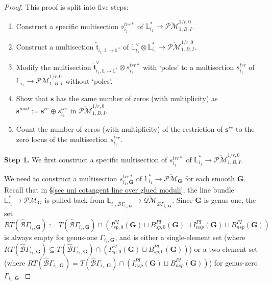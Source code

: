 \documentclass[11pt]{amsart}
\theoremstyle{definition}
\theoremstyle{remark}
\newcommand{\oPMb}{{\overline{\mathcal{PM}}}}
\newcommand{\oQMb}{{\overline{\mathcal{QM}}}}
\newcommand{\nontilde}{}
\newcommand{\<}{\left<}
\renewcommand{\>}{\right>}
\numberwithin{equation}{section}
\begin{document}
\begin{proof}
    
    This proof is split into five steps:
    \begin{enumerate}
        \item  Construct a specific multisection $\nontilde{s}^{trr*}_{i_1}$ of $\mathbb L^*_{i_1}\to \oPMb^{1/r,0}_{1,B,I}$.
        \item Construct a multisection $\tilde{\mathfrak{t}}_{i_1,\mathbb L \to \mathbb L^*}$ of $\mathbb L^\vee_{i_1}\otimes \mathbb L^*_{i_1}\to \oPMb^{1/r,0}_{1,B,I}$.
        \item  Modify the multisection $\tilde{\mathfrak{t}}^\vee_{i_1,\mathbb L \to \mathbb L^*}\otimes \nontilde{s}^{trr*}_{i_1}$ with `poles' to a multisection $\nontilde{s}^{trr}_{i_1}$ of $\mathbb L_{i_1}\to \oPMb^{1/r,0}_{1,B,I}$ without `poles'.
        \item Show that $\bm{s}$ has the same number of zeros (with multiplicity) as $\bm{s}^{mod}:=\bm{s}^{re} \oplus \nontilde{s}^{trr}_{i_1}$ in $\oPMb^{1/r,0}_{1,B,I}$.
        \item Count the number of zeros (with multiplicity) of the restriction of $\bm{s}^{re}$ to the zero locus of the multisection $\nontilde{s}^{trr}_{i_1}$.
        
    \end{enumerate}

   \noindent\textbf{Step 1.} 
    We first construct a specific multisection of $\nontilde{s}^{trr*}_{i_1}$ of $\mathbb L^*_{i_1}\to \oPMb^{1/r,0}_{1,B,I}$.  

   

      
        We need to construct a multisection $\nontilde{s}^{trr*}_{i_1,\mathbf{G}}$ of ${\mathbb L}^*_{i_1}\to \oPMb_{\bm{G}}$ for each smooth $\bm{G}$. Recall that in \S \ref{sec uni cotangent line over glued moduli}, the line bundle ${\mathbb L}^*_{i_1}\to \oPMb_{\bm{G}}$ is pulled back from $\mathbb L_{i_1,\hat{\mathcal B}\Gamma_{i_1,\bm{G}}}\to \oQMb_{\hat{\mathcal B}\Gamma_{i_1,\bm{G}}}$.  Since $\bm{G}$ is genus-one, the set 
        $$RT(\hat{\mathcal B}\Gamma_{i_1,\bm{G}}):=T(\hat{\mathcal B}\Gamma_{i_1,\bm{G}})\cap \left(I^{PI}_{sp,0}(\bm{G})\sqcup B^{PI}_{sp,0}(\bm{G})\sqcup I^{PI}_{nsp}(\bm{G})\sqcup B^{PI}_{nsp}(\bm{G})\right)$$ 
        is always empty for genus-one $\Gamma_{i_1,\mathbf{G}}$, and is either a single-element set (where $RT(\hat{\mathcal B}\Gamma_{i_1,\bm{G}})\subseteq T(\hat{\mathcal B}\Gamma_{i_1,\bm{G}})\cap \left(I^{PI}_{sp,0}(\bm{G})\sqcup B^{PI}_{sp,0}(\bm{G})\right)$) or a two-element set (where $RT(\hat{\mathcal B}\Gamma_{i_1,\bm{G}})=T(\hat{\mathcal B}\Gamma_{i_1,\bm{G}})\cap \left(I^{PI}_{nsp}(\bm{G})\sqcup B^{PI}_{nsp}(\bm{G})\right)$) for genus-zero $\Gamma_{i_1,\mathbf{G}}$. 


\end{proof}
\end{document}
